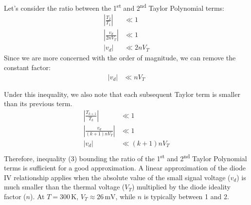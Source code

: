 \documentclass[12pt]{article}
\begin{document}
Let's consider the ratio between the 1\textsuperscript{st} and 2\textsuperscript{nd} Taylor Polynomial terms:
{
    \begin{align*}
        |\frac{T_2}{T_1}| &\ll 1 \\
        |\frac{v_d}{2nV_T}| &\ll 1 \\
        |v_d| &\ll 2nV_T
    \end{align*}
}
Since we are more concerned with the order of magnitude, we can remove the constant factor:
{
    \begin{align}
        |v_d| &\ll nV_T
    \end{align}
}

Under this inequality, we also note that each subsequent Taylor term is smaller than its previous term.
{
    \begin{align*}
        |\frac{T_{k+1}}{T_k}| &\ll 1 \\
        |\frac{v_d}{(k+1)nV_T}| &\ll 1 \\
        |v_d| &\ll (k+1)nV_T \\
    \end{align*}
}
Therefore, inequality (3) bounding the ratio of the 1\textsuperscript{st} and 2\textsuperscript{nd} Taylor Polynomial terms is sufficient for a good approximation. A linear approximation of the diode IV relationship applies when the absolute value of the small signal voltage ($v_d$) is much smaller than the thermal voltage ($V_T$) multiplied by the diode ideality factor ($n$). At $T=300\,\mathrm{K}$, $V_T \approx 26\,\mathrm{mV}$, while $n$ is typically between 1 and 2. 
\end{document}
